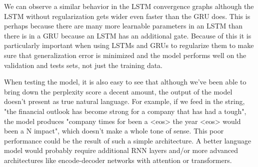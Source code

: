 \documentclass{article}
\begin{document}
We can observe a similar behavior in the LSTM convergence graphs although the LSTM without regularization gets wider even faster than the GRU does. This is perhaps because there are many more learnable parameters in an LSTM than there is in a GRU because an LSTM has an additional gate. Because of this it is particularly important when using LSTMs and GRUs to regularize them to make sure that generalization error is minimized and the model performs well on the validation and tests sets, not just the training data.

When testing the model, it is also easy to see that although we've been able to bring down the perplexity score a decent amount, the output of the model doesn't present as true natural language. For example, if we feed in the string, "the financial outlook has become strong for a company that has had a tough", the model produces "company times for been a <eos> the year <eos> would been a N impact", which doesn't make a whole tone of sense. This poor performance could be the result of such a simple architecture. A better language model would probably require additional RNN layers and/or more advanced architectures like encode-decoder networks with attention or transformers.
\end{document}
